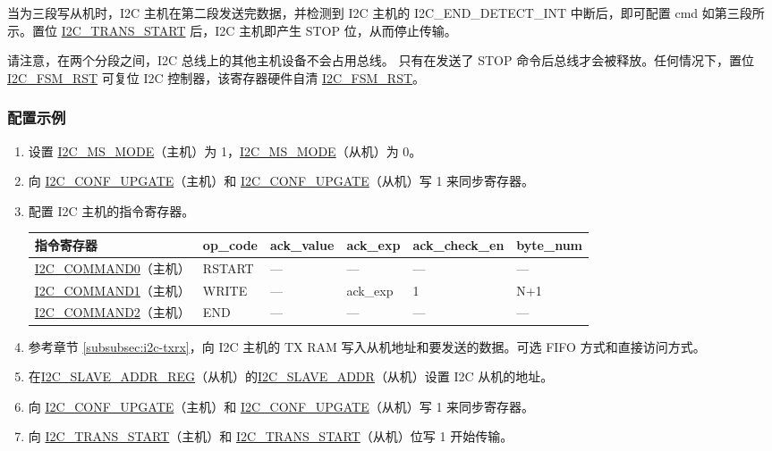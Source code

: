 \documentclass[main\_\_CN.tex]{subfiles}
\begin{document}
当为三段写从机时，I2C 主机在第二段发送完数据，并检测到 I2C 主机的 I2C\_END\_DETECT\_INT 中断后，即可配置 cmd 如第三段所示。置位 \hyperref[fielddesc:I2CTRANSSTART]{I2C\_TRANS\_START} 后，I2C 主机即产生 STOP 位，从而停止传输。

请注意，在两个分段之间，I2C 总线上的其他主机设备不会占用总线。 只有在发送了 STOP 命令后总线才会被释放。任何情况下，置位 \hyperref[fielddesc:I2CFSMRST]{I2C\_FSM\_RST} 可复位 I2C 控制器，该寄存器硬件自清 \hyperref[fielddesc:I2CFSMRST]{I2C\_FSM\_RST}。

\subsubsection{配置示例}
\begin{enumerate}
\item 设置 \hyperref[fielddesc:I2CMSMODE]{I2C\_MS\_MODE}（主机）为 1，\hyperref[fielddesc:I2CMSMODE]{I2C\_MS\_MODE}（从机）为 0。
\item 向 \hyperref[fielddesc:I2CCONFUPGATE]{I2C\_CONF\_UPGATE}（主机）和 \hyperref[fielddesc:I2CCONFUPGATE]{I2C\_CONF\_UPGATE}（从机）写 1 来同步寄存器。
\item 配置 I2C 主机的指令寄存器。
\begin{longtable}{ | p{4cm} | p{2cm} | p{2cm} | p{2cm} |p{2cm} | p{2cm} |}
\hline\rowcolor{lightgray}
指令寄存器& op\_code & ack\_value&ack\_exp&ack\_check\_en&byte\_num  \\ \hline
\hyperref[fielddesc:I2CCOMMAND0]{I2C\_COMMAND0}（主机）& RSTART& ---&---&---&---  \\ \hline
\hyperref[fielddesc:I2CCOMMAND1]{I2C\_COMMAND1}（主机）& WRITE& ---&ack\_exp&1&N+1  \\ \hline
\hyperref[fielddesc:I2CCOMMAND2]{I2C\_COMMAND2}（主机）& END& ---&---&---&---  \\ \hline
\end{longtable}
\item 参考章节 \ref{subsubsec:i2c-txrx}，向 I2C 主机的 TX RAM 写入从机地址和要发送的数据。可选 FIFO 方式和直接访问方式。
\item 在\hyperref[regdesc:I2CSLAVEADDRREG]{I2C\_SLAVE\_ADDR\_REG}（从机）的\hyperref[fielddesc:I2CSLAVEADDR]{I2C\_SLAVE\_ADDR}（从机）设置 I2C 从机的地址。
\item 向 \hyperref[fielddesc:I2CCONFUPGATE]{I2C\_CONF\_UPGATE}（主机）和 \hyperref[fielddesc:I2CCONFUPGATE]{I2C\_CONF\_UPGATE}（从机）写 1 来同步寄存器。
\item 向 \hyperref[fielddesc:I2CTRANSSTART]{I2C\_TRANS\_START}（主机）和 \hyperref[fielddesc:I2CTRANSSTART]{I2C\_TRANS\_START}（从机）位写 1 开始传输。

\end{enumerate}
\end{document}
